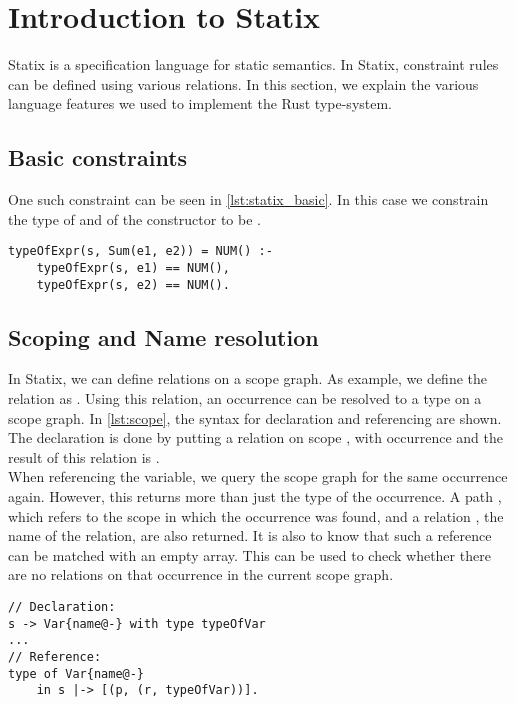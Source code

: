 \section{Introduction to Statix}\label{s:statix}
Statix is a specification language for static semantics. In Statix, constraint rules can be defined using various relations. In this section, we explain the various language features we used to implement the Rust type-system.

\subsection{Basic constraints} 
One such constraint can be seen in \autoref{lst:statix_basic}. In this case we constrain the type of  and  of the  constructor to be .  

 \begin{lstlisting}[showstringspaces=false, frame=single, escapechar=~, label={lst:statix_basic}, caption={Example of simple constraint rule}]
typeOfExpr(s, Sum(e1, e2)) = NUM() :- 
	typeOfExpr(s, e1) == NUM(),
	typeOfExpr(s, e2) == NUM().
  \end{lstlisting}
 
\subsection{Scoping and Name resolution}
In Statix, we can define relations on a scope graph. 
As example, we define the relation  as . Using this relation, an occurrence can be resolved to a type on a scope graph. In \autoref{lst:scope}, the syntax for declaration and referencing  are shown. The declaration is done by putting a relation on scope , with occurrence  and the result of this relation is . \\

When referencing the variable, we query the scope graph for the same occurrence again. However, this returns more than just the type of the occurrence. A path , which refers to the scope in which the occurrence was found, and a relation , the name of the relation, are also returned. It is also to know that such a reference can be matched with an empty array. This can be used to check whether there are no relations on that occurrence in the current scope graph. 

\begin{lstlisting}[showstringspaces=false, frame=single, escapechar=~, label={lst:scope}, caption={Declaring and resolving on a scope}]
// Declaration:
s -> Var{name@-} with type typeOfVar
...
// Reference: 
type of Var{name@-} 
    in s |-> [(p, (r, typeOfVar))].
\end{lstlisting}

